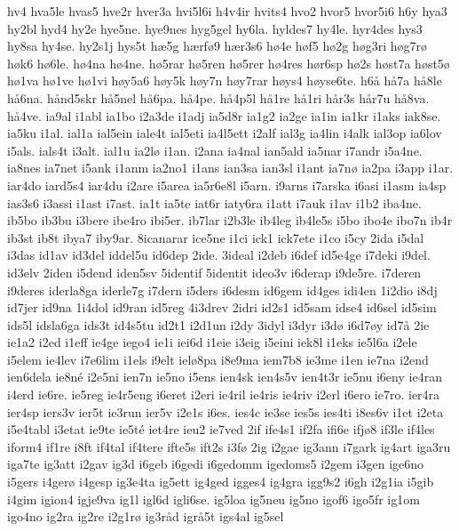 hv4
hva5le
hvas5
hve2r
hver3a
hvi5l6i
h4v4ir
hvits4
hvo2
hvor5
hvor5i6
h6y
hya3
hy2bl
hyd4
hy2e
hye5ne.
hye9nes
hyg5gel
hy6la.
hyldes7
hy4le.
hyr4des
hys3
hy8sa
hy4se.
hy2s1j
hys5t
h^^e65g
h^^e6rf^^f89
h^^e6r3s6
h^^f84e
h^^f8f5
h^^f82g
h^^f8g3ri
h^^f8g7r^^f8
h^^f8k6
h^^f86le.
h^^f84na
h^^f84ne.
h^^f85rar
h^^f85ren
h^^f85rer
h^^f84res
h^^f8r6sp
h^^f82s
h^^f8st7a
h^^f8st5^^f8
h^^f81va
h^^f81ve
h^^f81vi
h^^f8y5a6
h^^f8y5k
h^^f8y7n
h^^f8y7rar
h^^f8ys4
h^^f8yse6te.
h6^^e5
h^^e57a
h^^e58le
h^^e56na.
h^^e5nd5skr
h^^e55nel
h^^e56pa.
h^^e54pe.
h^^e54p5l
h^^e51re
h^^e51ri
h^^e5r3s
h^^e5r7u
h^^e58va.
h^^e54ve.
ia9al
i1abl
ia1bo
i2a3de
i1adj
ia5d8r
ia1g2
ia2ge
ia1in
ia1kr
i1aks
iak8se.
ia5ku
i1al.
ial1a
ial5ein
iale4t
ial5eti
ia4l5ett
i2alf
ial3g
ia4lin
i4alk
ial3op
ia6lov
i5als.
ials4t
i3alt.
ial1u
ia2l^^f8
i1an.
i2ana
ia4nal
ian5ald
ia5nar
i7andr
i5a4ne.
ia8nes
ia7net
i5ank
i1anm
ia2no1
i1ans
ian3sa
ian3sl
i1ant
ia7n^^f8
ia2pa
i3app
i1ar.
iar4do
iard5s4
iar4du
i2are
i5area
ia5r6e8l
i5arn.
i9arns
i7arska
i6asi
i1asm
ia4sp
ias3s6
i3assi
i1ast
i7ast.
ia1t
ia5te
iat6r
iaty6ra
i1att
i7auk
i1av
i1b2
iba4ne.
ib5bo
ib3bu
i3bere
ibe4ro
ibi5er.
ib7lar
i2b3le
ib4leg
ib4le5s
i5bo
ibo4e
ibo7n
ib4r
ib3st
ib8t
ibya7
iby9ar.
8icanarar
ice5ne
i1ci
ick1
ick7ete
i1co
i5cy
2ida
i5dal
i3das
id1av
id3del
iddel5u
id6dep
2ide.
3ideal
i2deb
i6def
id5e4ge
i7deki
i9del.
id3elv
2iden
i5dend
iden5sv
5identif
5identit
ideo3v
i6derap
i9de5re.
i7deren
i9deres
iderla8ga
iderle7g
i7dern
i5ders
i6desm
id6gem
id4ges
idi4en
1i2dio
i8dj
id7jer
id9na
1i4dol
id9ran
id5reg
4i3drev
2idri
id2s1
id5sam
idse4
id6sel
id5sim
ids5l
idsla6ga
ids3t
id4s5tu
id2t1
i2d1un
i2dy
3idyl
i3dyr
i3d^^f8
i6d7^^f8y
id7^^e5
2ie
ie1a2
i2ed
i1eff
ie4ge
iego4
ie1i
iei6d
i1eie
i3eig
i5eini
iek8l
i1eks
ie5l6a
i2ele
i5elem
ie4lev
i7e6lim
i1els
i9elt
iel^^f88pa
i8e9ma
iem7b8
ie3me
i1en
ie7na
i2end
ien6dela
ie8n^^e9
i2e5ni
ien7n
ie5no
i5ens
ien4sk
ien4s5v
ien4t3r
ie5nu
i6eny
ie4ran
i4erd
ie6re.
ie5reg
ie4r5eng
i6eret
i2eri
ie4ril
ie4ris
ie4riv
i2erl
i6ero
ie7ro.
ier4ra
ier4sp
iers3v
ier5t
ie3run
ier5v
i2e1s
i6es.
ies4c
ie3se
ies5s
ies4ti
i8es6v
i1et
i2eta
i5e4tabl
i3etat
ie9te
ie5t^^e9
iet4re
ieu2
ie7ved
2if
ife4s1
if2fa
ifi6e
ifj^^f88
if3le
if4les
iform4
if1re
i8ft
if4tal
if4tere
ifte5s
ift2s
i3f^^f8
2ig
i2gae
ig3ann
i7gark
ig4art
iga3ru
iga7te
ig3att
i2gav
ig3d
i6geb
i6gedi
i6gedomm
igedoms5
i2gem
i3gen
ige6no
i5gers
i4ger^^f8
i4gesp
ig3e4ta
ig5ett
ig4ged
igges4
ig4gra
igg9s2
i6gh
i2g1ia
i5gib
i4gim
igion4
igje9va
ig1l
igl6d
igli6se.
ig5loa
ig5neu
ig5no
igof6
igo5fr 
ig1om
igo4no
ig2ra
ig2re
i2g1r^^f8
ig3r^^e5d
igr^^e55t
igs4al
ig5sel
